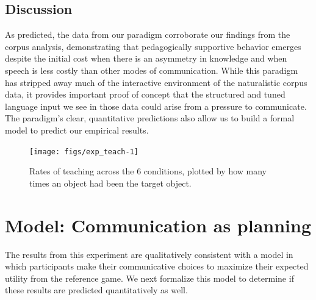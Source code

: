 \documentclass[10pt, letterpaper]{article}
\newenvironment{CodeChunk}{}{}
\begin{document}
\subsection{Discussion}\label{discussion-1}

As predicted, the data from our paradigm corroborate our findings from
the corpus analysis, demonstrating that pedagogically supportive
behavior emerges despite the initial cost when there is an asymmetry in
knowledge and when speech is less costly than other modes of
communication. While this paradigm has stripped away much of the
interactive environment of the naturalistic corpus data, it provides
important proof of concept that the structured and tuned language input
we see in those data could arise from a pressure to communicate. The
paradigm's clear, quantitative predictions also allow us to build a
formal model to predict our empirical results.

\begin{CodeChunk}
\begin{figure}[tb]
\texttt{[image: figs/exp\_teach-1]} \caption[Rates of teaching across the 6 conditions, plotted by how many times an object had been the target object]{Rates of teaching across the 6 conditions, plotted by how many times an object had been the target object.}\label{fig:exp_teach}
\end{figure}
\end{CodeChunk}

\section{Model: Communication as
planning}\label{model-communication-as-planning}

The results from this experiment are qualitatively consistent with a
model in which participants make their communicative choices to maximize
their expected utility from the reference game. We next formalize this
model to determine if these results are predicted quantitatively as
well.

\newcommand{\E}[1]{\mathbb{E}\left[ #1 \right]}
\end{document}
